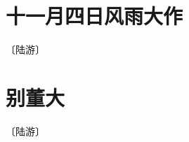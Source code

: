 \documentclass[12pt,UTF-8,openany]{ctexbook}
\begin{document}
\vspace{8pt}


\section{十一月四日风雨大作}

\begin{center}
    \vspace{10pt}
    
    \begin{normalsize}
        
        〔陆游〕
        
    \end{normalsize}
    
    \vspace{8pt}
    
    \begin{large}
        
        
        
    \end{large}
    
\end{center}

\vspace{8pt}


\section{别董大}

\begin{center}
    \vspace{10pt}
    
    \begin{normalsize}
        
        〔陆游〕
        
    \end{normalsize}
    
    \vspace{8pt}
    
    \begin{large}
        
        
        
    \end{large}
    
\end{center}
\end{document}
